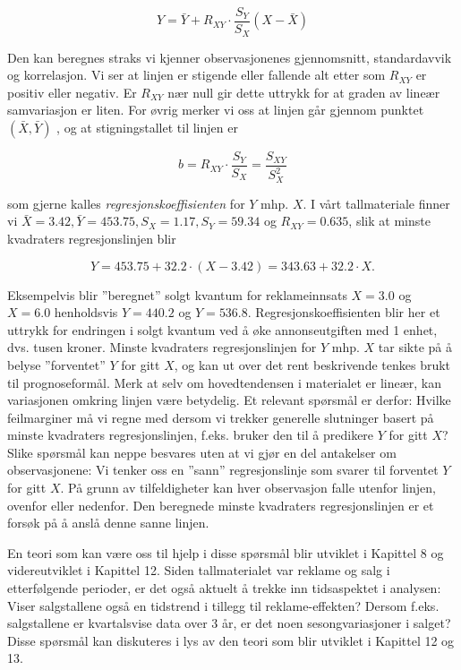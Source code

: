  \[Y=\bar{Y}+R_{XY} \cdot \frac{S_{Y}}{S_{X}} (X-\bar{X}) \]

 \noindent Den kan beregnes straks vi kjenner observasjonenes
 gjennomsnitt, standard\-avvik og korrelasjon. Vi ser at linjen
 er stigende eller fallende alt etter som $R_{XY}$ er positiv eller
 negativ. Er $R_{XY}$ nær null gir dette uttrykk for at graden
 av lineær samvariasjon er liten. For øvrig merker vi oss at
 linjen går gjennom punktet $(\bar{X},\bar{Y})$ , og at stigningstallet
 til linjen er

 \[b=R_{XY} \cdot \frac{S_{Y}}{S_{X}}=\frac{S_{XY}}{S_{X}^{2}} \]

 \noindent som gjerne kalles {\em regresjonskoeffisienten} for $Y$ mhp. $X$.
 I vårt tallmateriale finner vi $\bar{X}=3.42, \bar{Y}=453.75,
 S_{X}=1.17, S_{Y}=59.34$ og $R_{XY}=0.635$, slik at minste kvadraters
 regresjonslinjen blir

 \[Y =453.75 + 32.2 \cdot (X-3.42)= 343.63 + 32.2 \cdot X. \]

 \noindent Eksempelvis blir ''beregnet'' solgt kvantum for reklameinnsats
 $X = 3.0$ og $X = 6.0$ henholdsvis $Y = 440.2$ og $Y = 536.8$.
 Regresjonskoeffisienten blir her et uttrykk for endringen i solgt kvantum
 ved å øke annonseutgiften med 1 enhet, dvs. tusen kroner.
 Minste kvadraters regresjonslinjen for $Y$ mhp. $X$ tar sikte på å
 belyse ''forventet'' $Y$ for gitt $X$, og kan ut over det rent
 beskrivende tenkes brukt til prognoseformål. Merk at selv om
 hovedtendensen i materialet er lineær, kan variasjonen omkring
 linjen være betydelig. Et relevant spørsmål er derfor:
 Hvilke feilmarginer må vi regne med dersom vi trekker
 generelle slutninger basert på minste kvadraters
 regresjonslinjen, f.eks. bruker den til å predikere $Y$ for gitt
 $X$? Slike spørsmål kan neppe besvares uten at vi gjør en
 del antakelser om observasjonene: Vi tenker oss en ''sann''
 regresjonslinje som svarer til forventet $Y$ for gitt $X$. På
 grunn av tilfeldigheter kan hver observasjon falle utenfor
 linjen, ovenfor eller nedenfor. Den beregnede minste kvadraters
 regresjonslinjen er et forsøk på å anslå denne sanne linjen.

 En teori som kan være oss til hjelp i disse spørsmål blir utviklet
 i Kapittel 8 og videreutviklet i Kapittel 12. Siden
 tallmaterialet var reklame og salg i etterfølgende perioder,
 er det også aktuelt å trekke inn tidsaspektet i analysen: Viser
 salgstallene også en tidstrend i tillegg til reklame-effekten?
 Dersom f.eks. salgstallene er kvartalsvise data over 3 år,
 er det noen sesongvariasjoner i salget? Disse spørsmål kan diskuteres
 i lys av den teori som blir utviklet i Kapittel 12 og 13.

